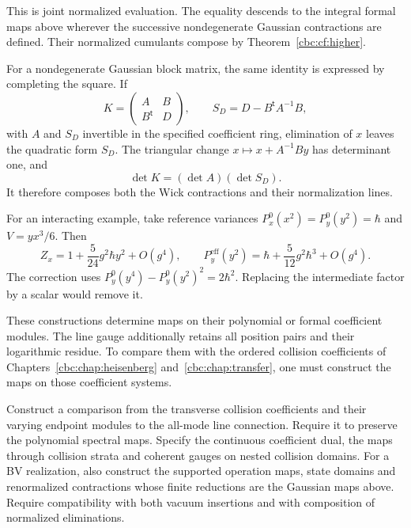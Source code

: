 This is joint normalized evaluation. The equality descends to
the integral formal maps above wherever the successive
nondegenerate Gaussian contractions are defined. Their
normalized cumulants compose by
Theorem~\ref{cbc:cf:higher}.

For a nondegenerate Gaussian block matrix, the same identity
is expressed by completing the square. If
\[
 K=\begin{pmatrix}A&B\\B^{\mathsf t}&D\end{pmatrix},
 \qquad S_D=D-B^{\mathsf t}A^{-1}B,
\]
with $A$ and $S_D$ invertible in the specified coefficient
ring, elimination of $x$ leaves the quadratic form $S_D$.
The triangular change
$x\mapsto x+A^{-1}By$ has determinant one, and
\[
 \det K=(\det A)(\det S_D).
\]
It therefore composes both the Wick contractions and their
normalization lines.

For an interacting example, take reference variances
$P_x^0(x^2)=P_y^0(y^2)=\hbar$ and $V=yx^3/6$. Then
\[
 Z_x=1+\frac5{24}g^2\hbar y^2+O(g^4),\qquad
 P_y^{\mathrm{eff}}(y^2)
       =\hbar+\frac5{12}g^2\hbar^3+O(g^4).
\]
The correction uses
$P_y^0(y^4)-P_y^0(y^2)^2=2\hbar^2$.
Replacing the intermediate factor by a scalar would remove it.

These constructions determine maps on their polynomial or formal
coefficient modules. The line gauge additionally retains all
position pairs and their logarithmic residue. To compare them
with the ordered collision coefficients of
Chapters~\ref{cbc:chap:heisenberg} and~\ref{cbc:chap:transfer},
one must construct the maps on those coefficient systems.

\begin{problem}\label{cbc:cf:chiral-comparison}
Construct a comparison from the transverse collision coefficients
and their varying endpoint modules to the all-mode line
connection. Require it to preserve the polynomial spectral maps.
Specify the continuous coefficient dual, the maps through
collision strata and coherent gauges on nested collision
domains. For a BV realization, also construct the supported
operation maps, state domains and renormalized contractions
whose finite reductions are the Gaussian maps above.
Require compatibility with both vacuum insertions and with
composition of normalized eliminations.
\end{problem}
